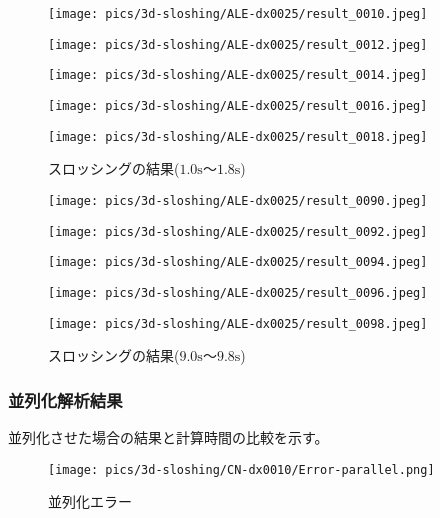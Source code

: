 \begin{figure}[H]
	\centering
	\begin{minipage}[b]{0.19\columnwidth}
	    \centering
	    \texttt{[image: pics/3d-sloshing/ALE-dx0025/result\_0010.jpeg]}
	\end{minipage}
	\begin{minipage}[b]{0.19\columnwidth}
	    \centering
	    \texttt{[image: pics/3d-sloshing/ALE-dx0025/result\_0012.jpeg]}
	\end{minipage}
	\begin{minipage}[b]{0.19\columnwidth}
	    \centering
	    \texttt{[image: pics/3d-sloshing/ALE-dx0025/result\_0014.jpeg]}
	\end{minipage}
	\begin{minipage}[b]{0.19\columnwidth}
	    \centering
	    \texttt{[image: pics/3d-sloshing/ALE-dx0025/result\_0016.jpeg]}
	\end{minipage}
	\begin{minipage}[b]{0.19\columnwidth}
	    \centering
	    \texttt{[image: pics/3d-sloshing/ALE-dx0025/result\_0018.jpeg]}
	\end{minipage}
	\caption{スロッシングの結果($1.0\mathrm{s}$～$1.8\mathrm{s}$)}
	\label{fig:sloshing-result}
\end{figure}
\begin{figure}[H]
	\centering
	\begin{minipage}[b]{0.19\columnwidth}
	    \centering
	    \texttt{[image: pics/3d-sloshing/ALE-dx0025/result\_0090.jpeg]}
	\end{minipage}
	\begin{minipage}[b]{0.19\columnwidth}
	    \centering
	    \texttt{[image: pics/3d-sloshing/ALE-dx0025/result\_0092.jpeg]}
	\end{minipage}
	\begin{minipage}[b]{0.19\columnwidth}
	    \centering
	    \texttt{[image: pics/3d-sloshing/ALE-dx0025/result\_0094.jpeg]}
	\end{minipage}
	\begin{minipage}[b]{0.19\columnwidth}
	    \centering
	    \texttt{[image: pics/3d-sloshing/ALE-dx0025/result\_0096.jpeg]}
	\end{minipage}
	\begin{minipage}[b]{0.19\columnwidth}
	    \centering
	    \texttt{[image: pics/3d-sloshing/ALE-dx0025/result\_0098.jpeg]}
	\end{minipage}
	\caption{スロッシングの結果($9.0\mathrm{s}$～$9.8\mathrm{s}$)}
	\label{fig:sloshing-result}
\end{figure}

\subsubsection{並列化解析結果}
並列化させた場合の結果と計算時間の比較を示す。

\begin{figure}[H]
    \centering
	\texttt{[image: pics/3d-sloshing/CN-dx0010/Error-parallel.png]}
	\caption{並列化エラー}
	\label{fig:3d-sloshing-error-parallel}
\end{figure}
